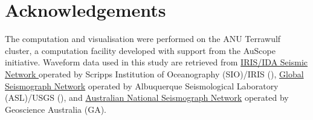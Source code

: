 \section*{Acknowledgements}

The computation and visualisation were performed on the ANU Terrawulf cluster, a computation facility developed with support from the AuScope initiative. Waveform data used in this study are retrieved from \href{https://doi.org/10.7914/SN/II}{IRIS/IDA Seismic Network } operated by Scripps Institution of Oceanography (SIO)/IRIS (\citeyear{scripps_institution_of_oceanography_global_1986}), \href{(https://doi.org/10.7914/SN/IU}{Global Seismograph Network} operated by  Albuquerque Seismological Laboratory (ASL)/USGS (\citeyear{albuquerque_seismological_laboratoryusgs_global_1988}), and \href{(https://doi.org/10.7914/SN/GA}{Australian National Seismograph Network} operated by Geoscience Australia (GA).



